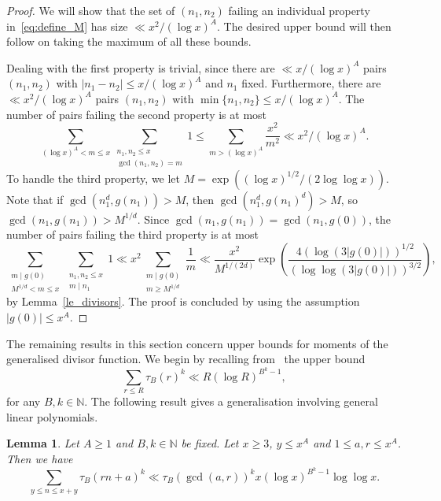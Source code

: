 \documentclass[11pt,letterpaper]{amsart}
\renewcommand{\leq}{\leqslant}
\renewcommand{\geq}{\geqslant}
\newtheorem{lemma}[theorem]{Lemma}
\theoremstyle{definition}
\numberwithin{equation}{section}
\newcommand\NN{\mathbb{N}}
\newcommand{\0}{\mathbf{0}}
\begin{document}
\begin{proof} 

We will show that the set of $(n_1,n_2)$ failing an individual property in~\eqref{eq:define_M} has size $\ll x^2/(\log x)^{A}$. The desired upper bound will then follow on taking the maximum of all these bounds. 

Dealing with the first property  is trivial, since  there are $\ll x/(\log x)^{A}$ pairs   $(n_1,n_2)$ with $|n_1-n_2|\leq x/(\log x)^{A}$ and $n_1 $ fixed.
Furthermore,  there are $\ll x^2/(\log x)^{A}$ pairs $(n_1,n_2)$ with $\min\{n_1, n_2\}\leq x/(\log x)^{A}$.
The number of pairs failing the second property is  at most 
$$
\sum_{(\log x)^{A} < m\leq x }\sum_{\substack{n_1,n_2\leq x \\ \gcd(n_1,n_2)=m}}1\leq \sum_{m> (\log x)^{A}}\frac{x^2}{m^2}\ll x^2/(\log x)^{A}.    
$$
To handle the third property, we let  $M=\exp((\log x)^{1/2}/(2\log \log x ))$. 
Note that if $\gcd(n_1^d,g(n_1))>M$, then $\gcd(n_1^d,g(n_1)^d)> M$, so $\gcd(n_1,g(n_1))> M^{1/d}$. Since $\gcd(n_1,g(n_1))=\gcd(n_1,g(0))$, 
the number of pairs failing the third property is  at most 
$$
\sum_{\substack{m\mid g(0)\\  M^{1/d}<m \leq x }}\sum_{\substack{n_1,n_2\leq x\\m\mid n_1}}1
 \ll x^2 \sum_{\substack{m\mid g(0)\\m\geq M^{1/d}}}\frac{1}{m} 
 \ll \frac{x^2}{M^{1/(2d)}}   \exp\left(\frac{4  (  \log(3|g(0)|))^{1/2}  }{ (  \log \log (3|g(0)| ))^{3/2} } \right) ,
 $$
by Lemma~\ref{le_divisors}. The proof  is  concluded by using the assumption    $ |g(0)| \leq  x^A$.
\end{proof}

The  remaining results in this section concern upper bounds for moments of the generalised divisor function.
We begin by recalling
 from~\cite[Eq~(1.80)]{iw-kow}
the 
upper bound 
\begin{equation}\label{eq:standard}
\sum_{r\leq R}\tau_{B}(r)^{k}\ll R(\log R)^{B^{k}-1},
\end{equation}
for any $B,k\in \NN$.
The following result gives a generalisation involving  general linear  polynomials.

\begin{lemma}\label{le_shiu} 
 Let $A\geq 1$ and $B,k\in \NN$ be fixed. 
Let $x\geq 3$, $y\leq x^{A}$ and $1\leq a,r\leq x^{A}$. Then we have
$$
\sum_{y\leq n\leq x+y}\tau_{B}(rn+a)^k\ll \tau_{B}(\gcd(a,r))^kx(\log x)^{B^k-1}\log \log x.
$$
\end{lemma}
\end{document}
